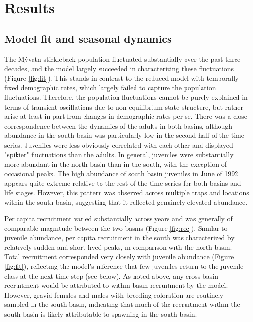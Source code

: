 \section*{Results}



\subsection*{Model fit and seasonal dynamics} 

The M\'{y}vatn stickleback population fluctuated substantially over the past
three decades, 
and the model largely succeeded in characterizing these fluctuations 
(Figure \ref{fig:fit}).
This stands in contrast to the reduced model with temporally-fixed demographic rates,
which largely failed to capture the population fluctuations.
Therefore, the population fluctuations cannot be purely explained 
in terms of transient oscillations due to non-equilibrium state structure, 
but rather arise at least in part from changes in demographic rates per se. 
There was a close correspondence between the dynamics of the adults in both basins,
although abundance in the south basin was particularly low 
in the second half of the time series.
Juveniles were less obviously correlated with each other 
and displayed "spikier" fluctuations than the adults.
In general, juveniles were substantially more abundant in the north basin than in the south,
with the exception of occasional peaks. 
The high abundance of south basin juveniles in June of 1992 appears quite extreme
relative to the rest of the time series for both basins and life stages.
However, this pattern was observed across multiple traps and locations within the south basin,
suggesting that it reflected genuinely elevated abundance.

Per capita recruitment varied substantially across years and was generally of comparable
magnitude between the two basins (Figure \ref{fig:rec}).
Similar to juvenile abundance, per capita recruitment in the south 
was characterized by relatively sudden and short-lived peaks, 
in comparison with the north basin.
Total recruitment corresponded very closely with juvenile abundance (Figure \ref{fig:fit}),
reflecting the model's inference 
that few juveniles return to the juvenile class at the next time step (see below).
As noted above, 
any cross-basin recruitment would be attributed 
to within-basin recruitment by the model. 
However, gravid females and males with breeding coloration are routinely sampled in the 
south basin, indicating that much of the recruitment within the south basin is 
likely attributable to spawning in the south basin.

